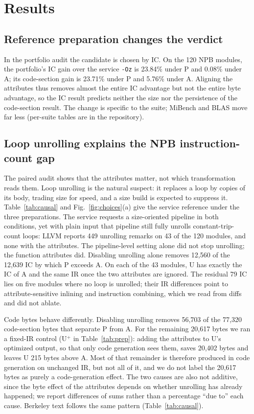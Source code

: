 \documentclass[conference,a4paper]{IEEEtran}
\begin{document}
\section{Results}

\subsection{Reference preparation changes the verdict}
In the portfolio audit the candidate is chosen by IC. On the 120 NPB
modules, the portfolio's IC gain over the service \texttt{-Oz} is
23.84\% under P and 0.08\% under A; its code-section gain is 23.71\%
under P and 5.76\% under A. Aligning the attributes thus removes almost
the entire IC advantage but not the entire byte advantage, so the IC
result predicts neither the size nor the persistence of the
code-section result. The change is specific to the suite; MiBench and
BLAS move far less (per-suite tables are in the repository).

\subsection{Loop unrolling explains the NPB instruction-count gap}
The paired audit shows that the attributes matter, not which
transformation reads them. Loop unrolling is the natural suspect: it
replaces a loop by copies of its body, trading size for speed, and a
size build is expected to suppress it. Table~\ref{tab:causal} and
Fig.~\ref{fig:choices}(a) give the service reference under the three
preparations. The service requests a size-oriented pipeline in both
conditions, yet with plain input that pipeline still fully unrolls
constant-trip-count loops: LLVM reports 449 unrolling remarks on 43 of
the 120 modules, and none with the attributes. The pipeline-level
setting alone did not stop unrolling; the function attributes did.
Disabling unrolling alone removes 12,560 of the 12,639 IC by which P
exceeds A. On each of the 43 modules, U has exactly the IC of A and the
same IR once the two attributes are ignored. The residual 79 IC lies on
five modules where no loop is unrolled; their IR differences point to
attribute-sensitive inlining and instruction combining, which we read
from diffs and did not ablate.

Code bytes behave differently. Disabling unrolling removes 56,703 of
the 77,320 code-section bytes that separate P from A. For the remaining
20,617 bytes we ran a fixed-IR control (U$^{+}$ in
Table~\ref{tab:prep}): adding the attributes to U's optimized output,
so that only code generation sees them, saves 20,402 bytes and leaves
U 215 bytes above A. Most of that remainder is
therefore produced in code generation on unchanged IR, but not all of
it, and we do not label the 20,617 bytes as purely a code-generation
effect. The two causes are also not additive, since the byte effect of
the attributes depends on whether unrolling has already happened; we
report differences of sums rather than a percentage ``due to'' each
cause. Berkeley text follows the same pattern
(Table~\ref{tab:causal}).
\end{document}
